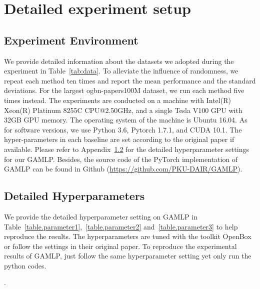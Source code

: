 \documentclass[sigconf]{acmart}
\newcommand{\sys}{\textsc{GAMLP}\xspace}
\newcommand{\blue}[1]{\textcolor{blue}{#1}}
\begin{document}
\section{Detailed experiment setup}
\label{app:settings}

\subsection{Experiment Environment}
\label{app:dataset}
We provide detailed information about the datasets we adopted during the experiment in Table~\ref{tab:data}.
To alleviate the influence of randomness, we repeat each method ten times and report the mean performance and the standard deviations.
For the largest ogbn-papers100M dataset, we run each method five times instead.
The experiments are conducted on a machine with Intel(R) Xeon(R) Platinum 8255C CPU@2.50GHz, and a single Tesla V100 GPU with 32GB GPU memory. 
The operating system of the machine is Ubuntu 16.04. 
As for software versions, we use Python 3.6, Pytorch 1.7.1, and CUDA 10.1.
The hyper-parameters in each baseline are set according to the original paper if available. Please refer to Appendix~\ref{hyperparameters} for the detailed hyperparameter settings for our GAMLP. Besides, the source code of the PyTorch implementation of \sys can be found in Github (\blue{\url{https://github.com/PKU-DAIR/GAMLP}}). 

\subsection{Detailed Hyperparameters}
\label{hyperparameters}
We provide the detailed hyperparameter setting on GAMLP in Table~\ref{table.parameter1},~\ref{table.parameter2} and~\ref{table.parameter3} to help reproduce the results.
The hyperparameters are tuned with the toolkit OpenBox~\citep{li2021openbox} or follow the settings in their original paper.
To reproduce the experimental results of GAMLP, just follow the same hyperparameter setting yet only run the python codes.

\begin{table}[tpb!]
\centering
{
\noindent
\caption{Efficiency comparison on the ogbn-products dataset}.
\label{tab:efficiency2}
}
\label{table.effi-ogbn}
\vspace{1mm}
\end{table}
\end{document}
